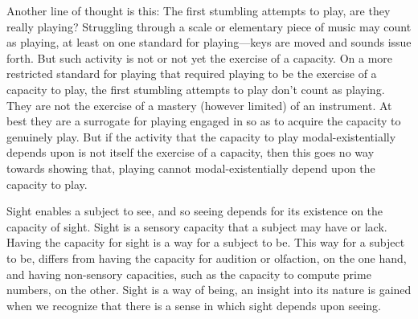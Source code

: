 \documentclass[12pt]{article}
\begin{document}
Another line of thought is this: The first stumbling attempts to play, are they really playing? Struggling through a scale or elementary piece of music may count as playing, at least on one standard for playing---keys are moved and sounds issue forth. But such activity is not or not yet the exercise of a capacity. On a more restricted standard for playing that required playing to be the exercise of a capacity to play, the first stumbling attempts to play don't count as playing. They are not the exercise of a mastery (however limited) of an instrument. At best they are a surrogate for playing engaged in so as to acquire the capacity to genuinely play. But if the activity that the capacity to play modal-existentially depends upon is not itself the exercise of a capacity, then this goes no way towards showing that, playing cannot modal-existentially depend upon the capacity to play.

Sight enables a subject to see, and so seeing depends for its existence on the capacity of sight. Sight is a sensory capacity that a subject may have or lack. Having the capacity for sight is a way for a subject to be. This way for a subject to be, differs from having the capacity for audition or olfaction, on the one hand, and having non-sensory capacities, such as the capacity to compute prime numbers, on the other. Sight is a way of being, an insight into its nature is gained when we recognize that there is a sense in which sight depends upon seeing.


 
 
\end{document}
